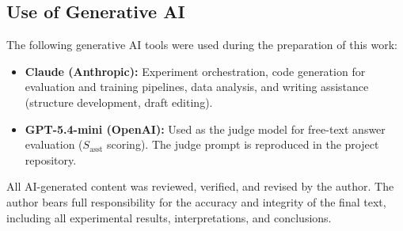 \begin{appendices}
\section{Use of Generative AI}

The following generative AI tools were used during the preparation of this work:

\begin{itemize}
    \item \textbf{Claude (Anthropic):} Experiment orchestration, code generation for evaluation and training pipelines, data analysis, and writing assistance (structure development, draft editing).
    \item \textbf{GPT-5.4-mini (OpenAI):} Used as the judge model for free-text answer evaluation ($S_{\text{asst}}$ scoring). The judge prompt is reproduced in the project repository.
\end{itemize}

All AI-generated content was reviewed, verified, and revised by the author. The author bears full responsibility for the accuracy and integrity of the final text, including all experimental results, interpretations, and conclusions.

\end{appendices}
